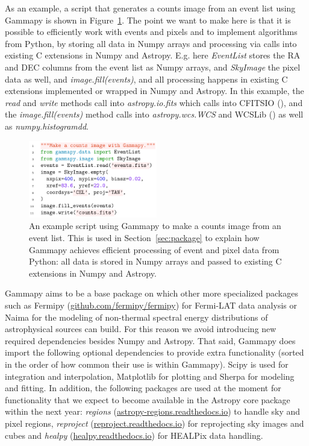 \documentclass{PoS}
\newcommand{\urlFermipy}{\href{https://github.com/fermipy/fermipy}{github.com/fermipy/fermipy}}
\newcommand{\urlHealpy}{\href{https://healpy.readthedocs.io}{healpy.readthedocs.io}}
\newcommand{\urlRegions}{\href{https://astropy-regions.readthedocs.io}{astropy-regions.readthedocs.io}}
\newcommand{\urlReproject}{\href{https://reproject.readthedocs.io}{reproject.readthedocs.io}}
\begin{document}
As an example, a script that generates a counts image from an event list using
Gammapy is shown in Figure~\ref{fig:code_example}. The point we want to make
here is that it is possible to efficiently work with events and pixels and to
implement algorithms from Python, by storing all data in Numpy arrays and
processing via calls into existing C extensions in Numpy and Astropy. E.g. here
\textit{EventList} stores the RA and DEC columns from the event list as Numpy
arrays, and \textit{SkyImage} the pixel data as well, and
\textit{image.fill(events)}, and all processing happens in existing C extensions
implemented or wrapped in Numpy and Astropy. In this example, the \textit{read}
and \textit{write} methods call into \textit{astropy.io.fits} which calls into
CFITSIO (\cite{cfitsio}), and the \textit{image.fill(events)} method calls into
\textit{astropy.wcs.WCS} and WCSLib (\cite{wcslib}) as well as
\textit{numpy.histogramdd}. 

\begin{figure}[t]
\centering
\includegraphics[width=0.5\textwidth]{examples/code_events_image}
\caption{
An example script using Gammapy to make a counts image from an event list. This
is used in Section~\protect\ref{sec:package} to explain how Gammapy achieves
efficient processing of event and pixel data from Python: all data is stored in
Numpy arrays and passed to existing C extensions in Numpy and Astropy.
}
\label{fig:code_example}
\end{figure}

Gammapy aims to be a base package on which other more specialized packages such
as Fermipy (\urlFermipy) for Fermi-LAT data analysis or Naima \cite{naima} for
the modeling of non-thermal spectral energy distributions of astrophysical
sources can build. For this reason we avoid introducing new required
dependencies besides Numpy and Astropy. That said, Gammapy does import the
following optional dependencies to provide extra functionality (sorted in the
order of how common their use is within Gammapy). Scipy \cite{scipy} is used for
integration and interpolation, Matplotlib \cite{matplotlib} for plotting and
Sherpa \cite{sherpa2001, sherpa2009, sherpa2011} for modeling and fitting. In
addition, the following packages are used at the moment for functionality that
we expect to become available in the Astropy core package within the next year:
\textit{regions} (\urlRegions) to handle sky and pixel regions,
\textit{reproject} (\urlReproject) for reprojecting sky images and cubes and
\textit{healpy} (\urlHealpy) for HEALPix data handling.
\end{document}
